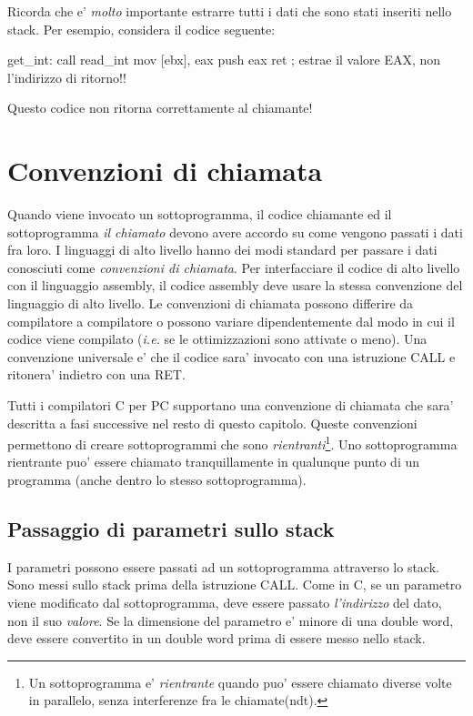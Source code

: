 Ricorda che e' \emph{molto} importante estrarre tutti i dati che sono stati
inseriti nello stack. Per esempio, considera il codice seguente: 
\begin{AsmCodeListing}[frame=none]
get_int:
      call   read_int
      mov    [ebx], eax
      push   eax
      ret                  ; estrae il valore EAX, non l'indirizzo di ritorno!!
\end{AsmCodeListing}
Questo codice non ritorna correttamente al chiamante!

\section{Convenzioni di chiamata}

Quando viene invocato un sottoprogramma, il codice chiamante ed il
sottoprogramma \emph{il chiamato} devono avere accordo su come 
vengono passati i dati fra loro. I linguaggi di alto livello hanno
dei modi standard per passare i dati conosciuti come \emph{convenzioni
di chiamata}. Per interfacciare il codice di alto livello con il
linguaggio assembly, il codice assembly deve usare la stessa
convenzione del linguaggio di alto livello. Le convenzioni di 
chiamata possono differire da compilatore a compilatore o possono
variare dipendentemente dal modo in cui il codice viene compilato
(\emph{i.e.} se le ottimizzazioni sono attivate o meno). Una 
convenzione universale e' che il codice sara' invocato con una
istruzione {\code CALL} e ritonera' indietro con una {\code RET}.

Tutti i compilatori C per PC supportano una convenzione di chiamata
che sara' descritta a fasi successive nel resto di questo capitolo.
Queste convenzioni permettono di creare sottoprogrammi che sono
\emph{rientranti}\footnote{Un sottoprogramma e' \emph{rientrante} quando 
puo' essere chiamato diverse volte in parallelo, senza interferenze fra
le chiamate(ndt).}. Uno sottoprogramma rientrante puo' essere chiamato
tranquillamente in qualunque punto di un programma (anche dentro
lo stesso sottoprogramma).

\subsection{Passaggio di parametri sullo stack}

I parametri possono essere passati ad un sottoprogramma attraverso lo stack.
Sono messi sullo stack prima della istruzione {\code CALL}. Come in C, se
un parametro viene modificato dal sottoprogramma, deve essere passato 
\emph{l'indirizzo} del dato, non il suo \emph{valore}. Se la dimensione del
parametro e' minore di una double word, deve essere convertito in un double
word prima di essere messo nello stack.

